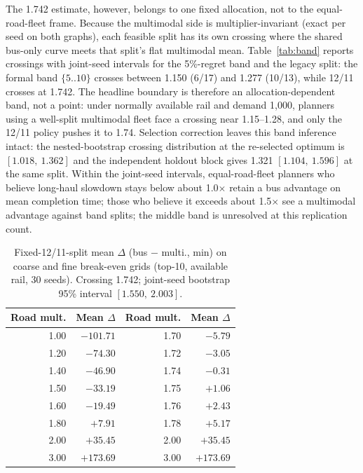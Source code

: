 \documentclass{ieeeaccess}
\begin{document}
The 1.742 estimate, however, belongs to one fixed allocation, not to the equal-road-fleet frame. Because the multimodal side is multiplier-invariant (exact per seed on both graphs), each feasible split has its own crossing where the shared bus-only curve meets that split's flat multimodal mean. Table~\ref{tab:band} reports crossings with joint-seed intervals for the 5\%-regret band and the legacy split: the formal band $\{5..10\}$ crosses between 1.150 (6/17) and 1.277 (10/13), while 12/11 crosses at 1.742. The headline boundary is therefore an allocation-dependent band, not a point: under normally available rail and demand 1{,}000, planners using a well-split multimodal fleet face a crossing near 1.15--1.28, and only the 12/11 policy pushes it to 1.74. Selection correction leaves this band inference intact: the nested-bootstrap crossing distribution at the re-selected optimum is $[1.018,\ 1.362]$ and the independent holdout block gives 1.321 $[1.104,\ 1.596]$ at the same split. Within the joint-seed intervals, equal-road-fleet planners who believe long-haul slowdown stays below about 1.0$\times$ retain a bus advantage on mean completion time; those who believe it exceeds about 1.5$\times$ see a multimodal advantage against band splits; the middle band is unresolved at this replication count.

\begin{table}[!t]
\caption{Fixed-12/11-split mean $\Delta$ (bus $-$ multi., min) on coarse and fine break-even grids (top-10, available rail, 30 seeds). Crossing 1.742; joint-seed bootstrap 95\% interval $[1.550,\ 2.003]$.}
\label{tab:be}
\centering
\footnotesize
\begin{tabular}{@{}rr@{\qquad}rr@{}}
\hline
Road mult. & Mean $\Delta$ & Road mult. & Mean $\Delta$ \\
\hline
1.00 & $-101.71$ & 1.70 & $-5.79$ \\
1.20 & $-74.30$ & 1.72 & $-3.05$ \\
1.40 & $-46.90$ & 1.74 & $-0.31$ \\
1.50 & $-33.19$ & 1.75 & $+1.06$ \\
1.60 & $-19.49$ & 1.76 & $+2.43$ \\
1.80 & $+7.91$ & 1.78 & $+5.17$ \\
2.00 & $+35.45$ & 2.00 & $+35.45$ \\
3.00 & $+173.69$ & 3.00 & $+173.69$ \\
\hline
\end{tabular}
\end{table}
\end{document}
